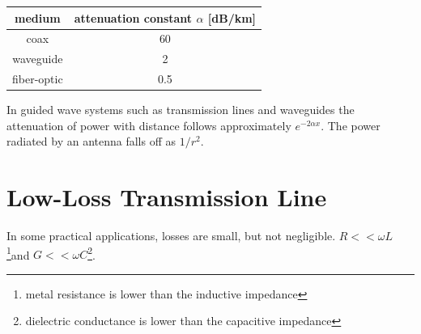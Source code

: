 \documentclass{ximera}
\begin{document}
\begin{center}
\begin{tabular}{|c|c|} \hline
medium     & attenuation constant $\alpha$ [dB/km]     \\  \hline       
coax        & 60                                 \\ \hline
 waveguide  & 2  \\ \hline          
fiber-optic &  0.5  \\ \hline
\end{tabular}
\end{center}


In guided wave systems such as transmission lines and waveguides the attenuation of power with distance follows approximately $e^{-2\alpha x}$. The power radiated by an antenna falls off as $1/r^{2}$.

\section{Low-Loss Transmission Line}








In some practical applications, losses are small, but not negligible.  $R<< \omega L$ \footnote{metal resistance is
lower than the inductive impedance}and $G <<  \omega C$\footnote{dielectric conductance is lower than the capacitive impedance}. 
\end{document}

